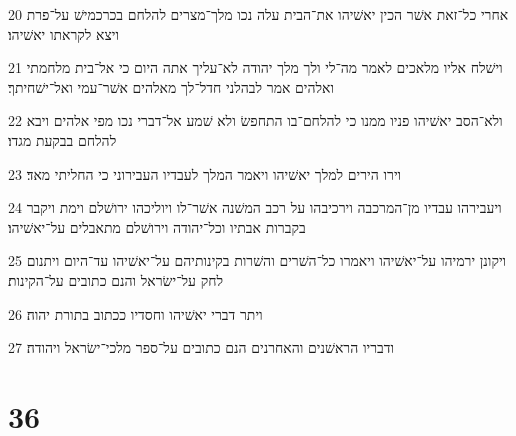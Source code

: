 \par 20 אחרי כל־זאת אשׁר הכין יאשׁיהו את־הבית עלה נכו מלך־מצרים להלחם בכרכמישׁ על־פרת ויצא לקראתו יאשׁיהו׃
\par 21 וישׁלח אליו מלאכים לאמר מה־לי ולך מלך יהודה לא־עליך אתה היום כי אל־בית מלחמתי ואלהים אמר לבהלני חדל־לך מאלהים אשׁר־עמי ואל־ישׁחיתך׃
\par 22 ולא־הסב יאשׁיהו פניו ממנו כי להלחם־בו התחפשׂ ולא שׁמע אל־דברי נכו מפי אלהים ויבא להלחם בבקעת מגדו׃
\par 23 וירו הירים למלך יאשׁיהו ויאמר המלך לעבדיו העבירוני כי החליתי מאד׃
\par 24 ויעבירהו עבדיו מן־המרכבה וירכיבהו על רכב המשׁנה אשׁר־לו ויוליכהו ירושׁלם וימת ויקבר בקברות אבתיו וכל־יהודה וירושׁלם מתאבלים על־יאשׁיהו׃
\par 25 ויקונן ירמיהו על־יאשׁיהו ויאמרו כל־השׁרים והשׁרות בקינותיהם על־יאשׁיהו עד־היום ויתנום לחק על־ישׂראל והנם כתובים על־הקינות׃
\par 26 ויתר דברי יאשׁיהו וחסדיו ככתוב בתורת יהוה׃
\par 27 ודבריו הראשׁנים והאחרנים הנם כתובים על־ספר מלכי־ישׂראל ויהודה׃

\chapter{36}

